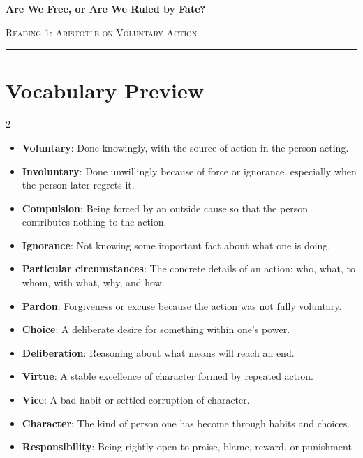 \documentclass[12pt]{article}
\begin{document}
\begin{center}
{\LARGE\bfseries Are We Free, or Are We Ruled by Fate?}\par\vspace{0.25em}
{\large\scshape Reading 1: Aristotle on Voluntary Action}\par\vspace{0.45em}
\rule{0.82\textwidth}{0.4pt}\par\vspace{0.7em}
\end{center}

\section*{Vocabulary Preview}
\begin{multicols}{2}
\begin{itemize}[leftmargin=*, itemsep=0.18em]
\item \textbf{Voluntary}: Done knowingly, with the source of action in the person acting.
\item \textbf{Involuntary}: Done unwillingly because of force or ignorance, especially when the person later regrets it.
\item \textbf{Compulsion}: Being forced by an outside cause so that the person contributes nothing to the action.
\item \textbf{Ignorance}: Not knowing some important fact about what one is doing.
\item \textbf{Particular circumstances}: The concrete details of an action: who, what, to whom, with what, why, and how.
\item \textbf{Pardon}: Forgiveness or excuse because the action was not fully voluntary.
\item \textbf{Choice}: A deliberate desire for something within one's power.
\item \textbf{Deliberation}: Reasoning about what means will reach an end.
\item \textbf{Virtue}: A stable excellence of character formed by repeated action.
\item \textbf{Vice}: A bad habit or settled corruption of character.
\item \textbf{Character}: The kind of person one has become through habits and choices.
\item \textbf{Responsibility}: Being rightly open to praise, blame, reward, or punishment.
\end{itemize}
\end{multicols}
\end{document}
